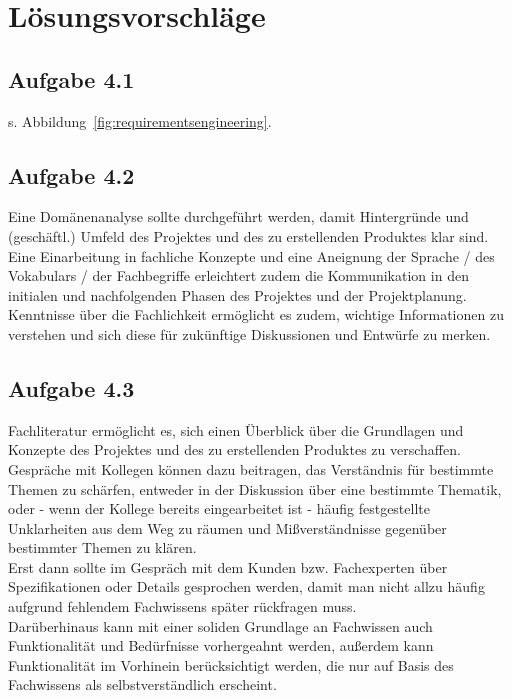 \section{Lösungsvorschläge}

\subsection{Aufgabe 4.1}

s. Abbildung~\ref{fig:requirementsengineering}.


\subsection{Aufgabe 4.2}

Eine Domänenanalyse sollte durchgeführt werden, damit Hintergründe und (geschäftl.) Umfeld des Projektes und des zu erstellenden Produktes klar sind.\\
Eine Einarbeitung in fachliche Konzepte und eine Aneignung der Sprache / des Vokabulars / der Fachbegriffe erleichtert zudem die Kommunikation in den initialen und nachfolgenden Phasen des Projektes und der Projektplanung.\\
Kenntnisse über die Fachlichkeit ermöglicht es zudem, wichtige Informationen zu verstehen und sich diese für zukünftige Diskussionen und Entwürfe zu merken.

\subsection{Aufgabe 4.3}
Fachliteratur ermöglicht es, sich einen Überblick über die Grundlagen und Konzepte des Projektes und des zu erstellenden Produktes zu verschaffen.\\
Gespräche mit Kollegen können dazu beitragen, das Verständnis für bestimmte Themen zu schärfen, entweder in der Diskussion über eine bestimmte Thematik, oder - wenn der Kollege bereits
eingearbeitet ist - häufig festgestellte Unklarheiten aus dem Weg zu räumen und Mißverständnisse gegenüber bestimmter Themen zu klären.\\
Erst dann sollte im Gespräch mit dem Kunden bzw. Fachexperten über Spezifikationen oder Details gesprochen werden, damit man nicht allzu häufig aufgrund fehlendem Fachwissens später rückfragen muss.\\
Darüberhinaus kann mit einer soliden Grundlage an Fachwissen auch Funktionalität und Bedürfnisse vorhergeahnt werden, außerdem kann Funktionalität im Vorhinein berücksichtigt werden, die nur auf Basis des Fachwissens als selbstverständlich erscheint.

